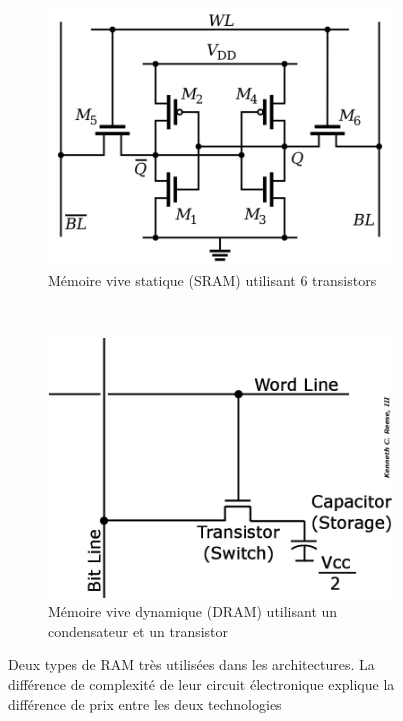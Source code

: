     
    \begin{figure}
        \begin{subfigure}[]{0.48\linewidth}\centering
            \includegraphics[width=0.80\linewidth]{images/processeurs_porte_sram.png}
            \caption{Mémoire vive statique (SRAM) utilisant 6 transistors}
            \label{pic_processeurs_porte_sram}
        \end{subfigure}
        ~ %
        \begin{subfigure}[]{0.48\linewidth}\centering
            \includegraphics[width=0.80\linewidth]{images/processeurs_porte_dram.png}
            \caption{Mémoire vive dynamique (DRAM) utilisant un condensateur et un transistor}
            \label{pic_processeurs_porte_dram}
        \end{subfigure}
        \caption{Deux types de RAM très utilisées dans les architectures. La différence de complexité de leur circuit électronique explique la différence de prix entre les deux technologies}
        \label{fig_processeurs_ram}
    \end{figure}
    

